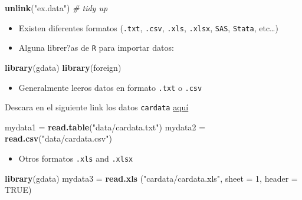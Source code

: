 \documentclass[]{book}
\newenvironment{Shaded}{\begin{snugshade}}{\end{snugshade}}
\newcommand{\KeywordTok}[1]{\textcolor[rgb]{0.13,0.29,0.53}{\textbf{#1}}}
\newcommand{\DataTypeTok}[1]{\textcolor[rgb]{0.13,0.29,0.53}{#1}}
\newcommand{\DecValTok}[1]{\textcolor[rgb]{0.00,0.00,0.81}{#1}}
\newcommand{\StringTok}[1]{\textcolor[rgb]{0.31,0.60,0.02}{#1}}
\newcommand{\CommentTok}[1]{\textcolor[rgb]{0.56,0.35,0.01}{\textit{#1}}}
\newcommand{\OtherTok}[1]{\textcolor[rgb]{0.56,0.35,0.01}{#1}}
\newcommand{\NormalTok}[1]{#1}
\providecommand{\tightlist}{%
  \setlength{\itemsep}{0pt}\setlength{\parskip}{0pt}}
\begin{document}
\begin{Shaded}
\begin{Highlighting}[]
\KeywordTok{unlink}\NormalTok{(}\StringTok{"ex.data"}\NormalTok{) }\CommentTok{# tidy up}
\end{Highlighting}
\end{Shaded}

\begin{itemize}
\item
  Existen diferentes formatos (\texttt{.txt}, \texttt{.csv},
  \texttt{.xls}, \texttt{.xlsx}, \texttt{SAS}, \texttt{Stata},
  etc\ldots{})
\item
  Alguna librer?as de \texttt{R} para importar datos:
\end{itemize}

\begin{Shaded}
\begin{Highlighting}[]
\KeywordTok{library}\NormalTok{(gdata)}
\KeywordTok{library}\NormalTok{(foreign)}
\end{Highlighting}
\end{Shaded}

\bigskip

\begin{itemize}
\tightlist
\item
  Generalmente leeros datos en formato \texttt{.txt} o \texttt{.csv}
\end{itemize}

Descara en el siguiente link los datos \texttt{cardata}
\href{data/cardata.zip}{aquí}

\begin{Shaded}
\begin{Highlighting}[]
\NormalTok{mydata1 =}\StringTok{ }\KeywordTok{read.table}\NormalTok{(}\StringTok{"data/cardata.txt"}\NormalTok{) }
\NormalTok{mydata2 =}\StringTok{ }\KeywordTok{read.csv}\NormalTok{(}\StringTok{"data/cardata.csv"}\NormalTok{)  }
\end{Highlighting}
\end{Shaded}

\begin{itemize}
\tightlist
\item
  Otros formatos \texttt{.xls} and \texttt{.xlsx}
\end{itemize}

\begin{Shaded}
\begin{Highlighting}[]
\KeywordTok{library}\NormalTok{(gdata)}
\NormalTok{mydata3 =}\StringTok{ }\KeywordTok{read.xls}\NormalTok{ (}\StringTok{"cardata/cardata.xls"}\NormalTok{, }\DataTypeTok{sheet =} \DecValTok{1}\NormalTok{, }\DataTypeTok{header =} \OtherTok{TRUE}\NormalTok{)}
\end{Highlighting}
\end{Shaded}
\end{document}
